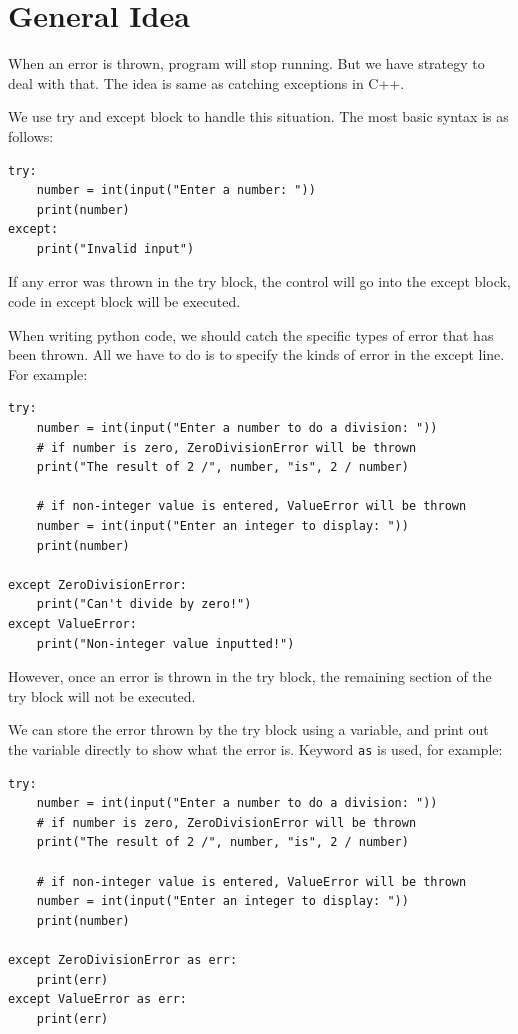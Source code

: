 \documentclass[12pt]{book}
\begin{document}
\section{General Idea}
\label{sec:orgc76da18}
When an error is thrown, program will stop running. But we have strategy to deal with that. The idea is same as catching exceptions in C++.

We use try and except block to handle this situation. The most basic syntax is as follows:
\begin{verbatim}
try:
    number = int(input("Enter a number: "))
    print(number)
except:
    print("Invalid input")
\end{verbatim}
If any error was thrown in the try block, the control will go into the except block, code in except block will be executed.

When writing python code, we should catch the specific types of error that has been thrown. All we have to do is to specify the kinds of error in the except line. For example:
\begin{verbatim}
try:
    number = int(input("Enter a number to do a division: "))
    # if number is zero, ZeroDivisionError will be thrown
    print("The result of 2 /", number, "is", 2 / number)

    # if non-integer value is entered, ValueError will be thrown
    number = int(input("Enter an integer to display: "))
    print(number)

except ZeroDivisionError:
    print("Can't divide by zero!")
except ValueError:
    print("Non-integer value inputted!")
\end{verbatim}
However, once an error is thrown in the try block, the remaining section of the try block will not be executed.

We can store the error thrown by the try block using a variable, and print out the variable directly to show what the error is. Keyword \texttt{as} is used, for example:
\begin{verbatim}
try:
    number = int(input("Enter a number to do a division: "))
    # if number is zero, ZeroDivisionError will be thrown
    print("The result of 2 /", number, "is", 2 / number)

    # if non-integer value is entered, ValueError will be thrown
    number = int(input("Enter an integer to display: "))
    print(number)

except ZeroDivisionError as err:
    print(err)
except ValueError as err:
    print(err)
\end{verbatim}
\end{document}
